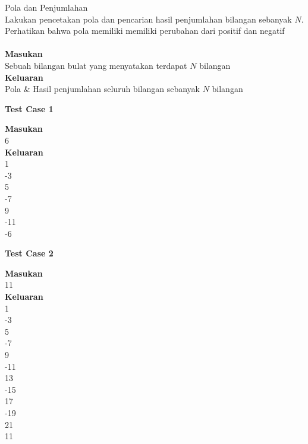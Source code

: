 \newpage
\begin{permasalahan}{Pola dan Penjumlahan}\\
\label{prob:PoladanPenjumlahan}
		Lakukan pencetakan pola dan pencarian hasil penjumlahan bilangan sebanyak $N$. Perhatikan bahwa pola memiliki memiliki perubahan dari positif dan negatif \\\\
	\textbf{Masukan}\\
	Sebuah bilangan bulat yang menyatakan terdapat $N$ bilangan\\
	\textbf{Keluaran}\\
	Pola \& Hasil penjumlahan seluruh bilangan sebanyak  $N$ bilangan
	\\
	\begin{center}
	\textbf{Test Case 1}\\
	\end{center}
	\textbf{Masukan}\\
	6\\
	\textbf{Keluaran}\\
1\\
-3\\
5\\
-7\\
9\\
-11\\
-6\\
	\begin{center}
	\textbf{Test Case 2}\\
	\end{center}
	\textbf{Masukan}\\
	11\\
	\textbf{Keluaran}\\
1\\
-3\\
5\\
-7\\
9\\
-11\\
13\\
-15\\
17\\
-19\\
21\\
11\\
\end{permasalahan}


